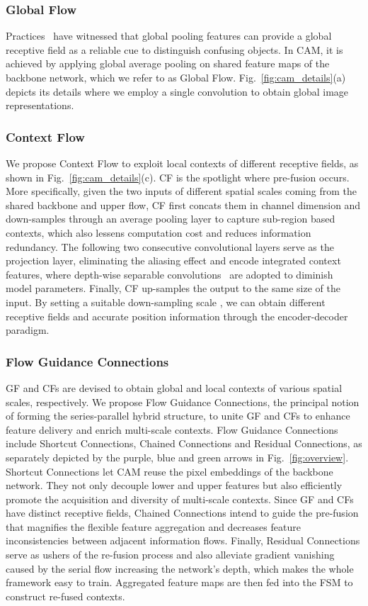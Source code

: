 \documentclass[journal]{IEEEtran}
\begin{document}
\subsubsection{Global Flow}
Practices~\cite{zhao2017pyramid,chen2017rethinking,zhang2019co,liu2015parsenet} have witnessed that global pooling features can provide a global receptive field as a reliable cue to distinguish confusing objects. In CAM, it is achieved by applying global average pooling on shared feature maps of the backbone network, which we refer to as Global Flow. Fig.~\ref{fig:cam_details}(a) depicts its details where we employ a single  convolution to obtain global image representations.

\subsubsection{Context Flow}
We propose Context Flow to exploit local contexts of different receptive fields, as shown in Fig.~\ref{fig:cam_details}(c). CF is the spotlight where pre-fusion occurs. More specifically, given the two inputs of different spatial scales coming from the shared backbone and upper flow, CF first concats them in channel dimension and down-samples  through an average pooling layer to capture sub-region based contexts, which also lessens computation cost and reduces information redundancy. The following two consecutive convolutional layers serve as the projection layer, eliminating the aliasing effect and encode integrated context features, where depth-wise separable convolutions~\cite{howard2017mobilenets} are adopted to diminish model parameters. Finally, CF up-samples the output to the same size of the input. By setting a suitable down-sampling scale , we can obtain different receptive fields and accurate position information through the encoder-decoder paradigm.

\subsubsection{Flow Guidance Connections}
GF and CFs are devised to obtain global and local contexts of various spatial scales, respectively. We propose Flow Guidance Connections, the principal notion of forming the series-parallel hybrid structure, to unite GF and CFs to enhance feature delivery and enrich multi-scale contexts. Flow Guidance Connections include Shortcut Connections, Chained Connections and Residual Connections, as separately depicted by the purple, blue and green arrows in Fig.~\ref{fig:overview}. Shortcut Connections let CAM reuse the pixel embeddings of the backbone network. They not only decouple lower and upper features but also efficiently promote the acquisition and diversity of multi-scale contexts. Since GF and CFs have distinct receptive fields, Chained Connections intend to guide the pre-fusion that magnifies the flexible feature aggregation and decreases feature inconsistencies between adjacent information flows. Finally, Residual Connections serve as ushers of the re-fusion process and also alleviate gradient vanishing caused by the serial flow increasing the network’s depth, which makes the whole framework easy to train. Aggregated feature maps are then fed into the FSM to construct re-fused contexts.
\end{document}

